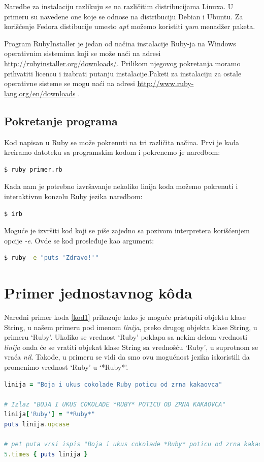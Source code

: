 \documentclass[a4paper]{article}
\begin{document}
Naredbe za instalaciju razlikuju se na različitim distribucijama Linuxa. U primeru su navedene one koje se odnose na distribuciju Debian i Ubuntu. Za korišćenje Fedora distibucije umesto \emph{apt} možemo koristiti \emph{yum} menadžer paketa.

Program RubyInstaller je jedan od načina instalacije Ruby-ja na Windows operativnim sistemima koji se može naći na adresi \url{http://rubyinstaller.org/downloads/}. Prilikom njegovog pokretanja moramo prihvatiti licencu i izabrati putanju instalacije.Paketi za instalaciju za ostale operativne sisteme se mogu naći na adresi \url{http://www.ruby-lang.org/en/downloads} \cite{rubyLang}.
\subsection{Pokretanje programa}
Kod napisan u Ruby se može pokrenuti na tri različita načina. Prvi je kada kreiramo datoteku sa programskim kodom i pokrenemo je naredbom:
\begin{lstlisting}[language=bash]
  $ ruby primer.rb
\end{lstlisting}\vspace*{-15pt}
Kada nam je potrebno izvršavanje nekoliko linija koda možemo pokrenuti i interaktivnu konzolu Ruby jezika naredbom:
\begin{lstlisting}[language=bash]
  $ irb
\end{lstlisting}\vspace*{-15pt}
Moguće je izvršiti kod koji se piše zajedno sa pozivom interpretera korišćenjem opcije \emph{-e}. Ovde se kod prosleđuje kao argument:
\begin{lstlisting}[language=bash]
  $ ruby -e "puts 'Zdravo!'"
\end{lstlisting}\vspace*{-15pt}

\section{Primer jednostavnog k\^{o}da}
Naredni  primer koda \ref{kod1} prikazuje kako je moguće pristupiti objektu klase String, u našem primeru pod imenom \emph{linija}, preko drugog objekta klase String, u primeru ‘Ruby’. Ukoliko se vrednost ‘Ruby’ poklapa sa nekim delom vrednosti \emph{linija} onda će se vratiti objekat klase String sa vrednošću ‘Ruby’, u suprotnom se vraća \emph{nil}. Takođe, u primeru se vidi da smo ovu mogućnost jezika iskoristili da promenimo vrednost ‘Ruby’ u ‘*Ruby*’.
\begin{lstlisting}[language=Ruby, caption={Prvi primer koda}, frame=single, label=kod1]
linija = "Boja i ukus cokolade Ruby poticu od zrna kakaovca"

# Izlaz "BOJA I UKUS COKOLADE *RUBY* POTICU OD ZRNA KAKAOVCA"
linija['Ruby'] = "*Ruby*"
puts linija.upcase

# pet puta vrsi ispis "Boja i ukus cokolade *Ruby* poticu od zrna kakaovca"
5.times { puts linija }
\end{lstlisting}
\end{document}
